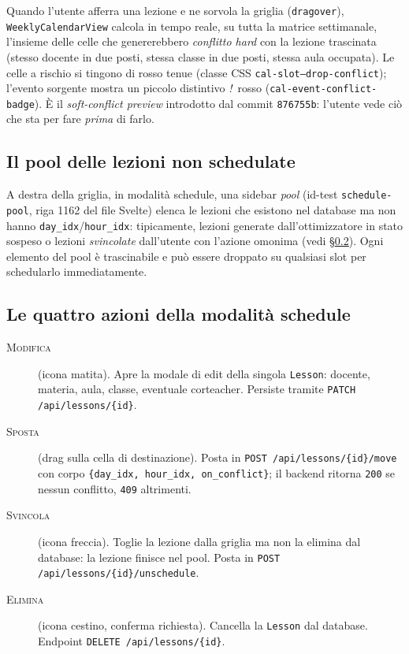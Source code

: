 Quando l'utente afferra una lezione e ne sorvola la griglia
(\texttt{dragover}), \texttt{WeeklyCalendarView} calcola in tempo
reale, su tutta la matrice settimanale, l'insieme delle celle
che genererebbero \emph{conflitto hard} con la lezione trascinata
(stesso docente in due posti, stessa classe in due posti, stessa
aula occupata). Le celle a rischio si tingono di rosso tenue
(classe CSS \texttt{cal-slot--drop-conflict}); l'evento sorgente
mostra un piccolo distintivo \emph{!}\ rosso
(\texttt{cal-event-conflict-badge}). \`E il \emph{soft-conflict
preview} introdotto dal commit \texttt{876755b}: l'utente
vede ci\`o che sta per fare \emph{prima} di farlo.

\subsection{Il pool delle lezioni non schedulate}
\label{sec:pool-unscheduled}

A destra della griglia, in modalit\`a schedule, una sidebar
\emph{pool} (id-test
\texttt{schedule-pool}, riga 1162 del file Svelte) elenca le
lezioni che esistono nel database ma non hanno
\texttt{day\_idx}/\texttt{hour\_idx}: tipicamente, lezioni
generate dall'ottimizzatore in stato sospeso o lezioni
\emph{svincolate} dall'utente con l'azione omonima (vedi
\S\ref{sec:azioni-quattro}). Ogni elemento del pool \`e
trascinabile e pu\`o essere droppato su qualsiasi slot per
schedularlo immediatamente.

\subsection{Le quattro azioni della modalit\`a schedule}
\label{sec:azioni-quattro}

\begin{description}
  \item[\textsc{Modifica}] (icona matita). Apre la modale di
    edit della singola \texttt{Lesson}: docente, materia, aula,
    classe, eventuale corteacher. Persiste tramite
    \texttt{PATCH /api/lessons/\{id\}}.
  \item[\textsc{Sposta}] (drag sulla cella di destinazione).
    Posta in \texttt{POST /api/lessons/\{id\}/move} con corpo
    \texttt{\{day\_idx, hour\_idx, on\_conflict\}}; il backend
    ritorna \texttt{200} se nessun conflitto, \texttt{409}
    altrimenti.
  \item[\textsc{Svincola}] (icona freccia). Toglie la lezione
    dalla griglia ma non la elimina dal database: la lezione
    finisce nel pool. Posta in \texttt{POST
    /api/lessons/\{id\}/unschedule}.
  \item[\textsc{Elimina}] (icona cestino, conferma richiesta).
    Cancella la \texttt{Lesson} dal database. Endpoint
    \texttt{DELETE /api/lessons/\{id\}}.
\end{description}

